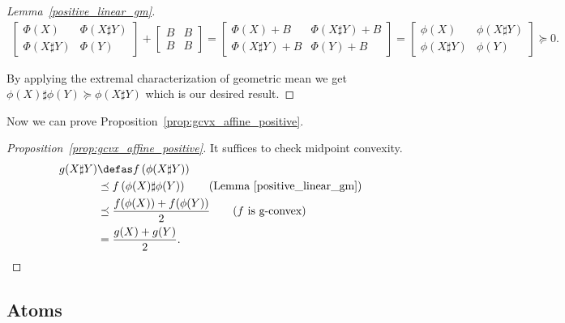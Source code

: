 \documentclass[twoside,11pt]{article}
\begin{document}
\begin{proof}[Lemma~\ref{positive_linear_gm}]
         \begin{equation}
        \begin{aligned}
\begin{bmatrix}
            \Phi(X)  & \Phi\left(X \sharp Y\right)  
            \\ \Phi\left(X\sharp Y\right)   &\Phi(Y) 
        \end{bmatrix} 
        + 
        \begin{bmatrix}
            B & B \\
            B & B
        \end{bmatrix}
        =
        \begin{bmatrix}
            \Phi(X)+ B &\Phi\left(X \sharp Y\right)   + B \\
            \Phi\left(X\sharp Y\right)+ B & \Phi(Y) + B
        \end{bmatrix}
        = \begin{bmatrix}
            \phi(X)  & \phi\left(X \sharp Y\right)  
            \\ \phi\left(X\sharp Y\right)   &\phi(Y) 
        \end{bmatrix} 
        \succeq 0 .
        \end{aligned}
    \end{equation}

 By applying the extremal characterization of geometric mean we get $\phi(X) \sharp \phi(Y) \succeq \phi(X \sharp Y)$ which is our desired result.
\end{proof}



Now we can prove Proposition~\ref{prop:gcvx_affine_positive}.

\begin{proof}[Proposition~\ref{prop:gcvx_affine_positive}]
    It suffices to check midpoint convexity. 
    \[
    \begin{aligned}
        g(X \sharp Y) &\defas f\left(\phi(X\sharp Y) \right) 
        \\& \preceq f \left( \phi(X)  \sharp \phi(Y) \right) \qquad (\text{Lemma~\ref{positive_linear_gm})}
        \\& \preceq \frac{f(\phi(X)) + f(\phi(Y))}{2} \qquad (f \text{ is g-convex})
        \\& = \frac{g(X) + g(Y)}{2}.
    \end{aligned}
    \]
\end{proof}


\subsection{Atoms}\label{app:gcvx_atoms}
\end{document}
